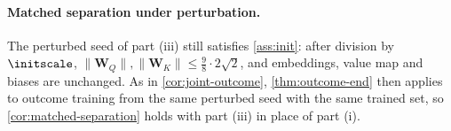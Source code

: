 \paragraph{Matched separation under perturbation.} The perturbed seed of part (iii) still satisfies \cref{ass:init}: after division by
$\initscale$, $\|\mathbf W_Q\|,\|\mathbf W_K\|\le\frac98\cdot2\sqrt2$, and embeddings, value map and biases are unchanged. As in \cref{cor:joint-outcome},
\cref{thm:outcome-end} then applies to outcome training from the same perturbed seed with the same trained set, so
\cref{cor:matched-separation} holds with part (iii) in place of part (i).
